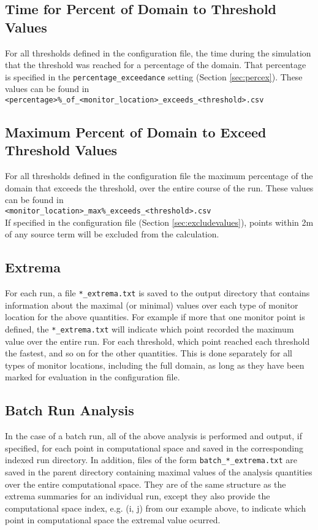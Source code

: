 \documentclass[]{article}
\def\code#1{\texttt{#1}}
\begin{document}
\subsection{Time for Percent of Domain to Threshold Values}
For all thresholds defined in the configuration file, the time during the
simulation that the threshold was reached for a percentage of the domain. That
percentage is specified in the
\code{percentage\_exceedance} setting (Section
\ref{sec:percex}). These values can be found in\\

\code{<percentage>\%\_of\_<monitor\_location>\_exceeds\_<threshold>.csv} 

\subsection{Maximum Percent of Domain to Exceed Threshold Values}
For all thresholds defined in the configuration file the maximum percentage of
the domain that exceeds the threshold, over the entire course of the run. These
values can be found in\\

\code{<monitor\_location>\_max\%\_exceeds\_<threshold>.csv} \\

If specified in the configuration file (Section \ref{sec:excludevalues}), points
within 2m of any source term will be excluded from the calculation.\\

\subsection{Extrema}
\noindent For each run, a file \code{*\_extrema.txt} is saved to the output directory that
contains information about the maximal (or minimal) values over each type of
monitor location for the above quantities. For example if more that one monitor
point is defined, the \code{*\_extrema.txt} will indicate which point recorded
the maximum value over the entire run. For each threshold, which point reached
each threshold the fastest, and so on for the other quantities. This is done
separately for all types of monitor locations, including the full domain, as
long as they have been marked for evaluation in the configuration file.

\subsection{Batch Run Analysis}
In the case of a batch run, all of the above analysis is performed and output,
if specified, for each point in computational space and saved in the
corresponding indexed run directory. In addition, files of the form
\code{batch\_*\_extrema.txt} are saved in the parent directory containing
maximal values of the analysis quantities over the entire computational space.
They are of the same structure as the extrema summaries for an individual run,
except they also provide the computational space index, e.g. (i, j) from our
example above, to indicate which point in computational space the extremal value
ocurred.
\end{document}
